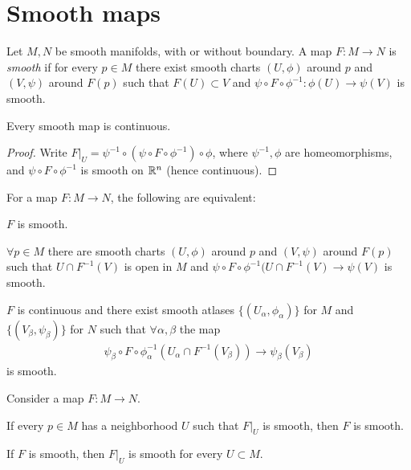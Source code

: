 \documentclass{skript}
\begin{document}
\section{Smooth maps}
\begin{definition}\label{def:smoothmap}
Let $M,N$ be smooth manifolds, with or without boundary.
A map $F\colon M\to N$ is \emph{smooth} if for every $p\in M$ there exist smooth charts $(U,\phi)$ around $p$ and $(V,\psi)$ around $F(p)$ such that $F(U)\subset V$ and $\psi\circ F\circ \phi^{-1}\colon \phi(U) \to \psi(V)$ is smooth. 
\end{definition}

\begin{prop}\label{prop:smoothmapcont}
    Every smooth map is continuous.
\end{prop}
\begin{proof}
    Write $F|_U = \psi^{-1}\circ (\psi\circ F\circ \phi^{-1})\circ \phi$, 
    where $\psi^{-1},\phi$ are homeomorphisms, and $\psi\circ F\circ\phi^{-1}$ is smooth on $\mathbb{R}^n$ (hence continuous).
\end{proof}

\begin{prop}
    For a map $F\colon M\to N$, the following are equivalent:
    \begin{alphanumerate}
    \item
        $F$ is smooth.
    \item
        $\forall p\in M$ there are smooth charts $(U,\phi)$ around $p$ and $(V,\psi)$ around $F(p)$ such that $U\cap F^{-1}(V)$ is open in $M$ and $\psi\circ F\circ \phi^{-1} (U\cap F^{-1}(V)\to \psi(V)$ is smooth.
    \item
        $F$ is continuous and there exist smooth atlases $\{(U_\alpha, \phi_\alpha)\}$ for $M$ and $\{(V_\beta, \psi_\beta)\}$ for $N$ such that $\forall \alpha,\beta$ the map
        \begin{align*}
            \psi_\beta \circ F \circ \phi^{-1}_\alpha (U_\alpha\cap F^{-1}(V_\beta)) \to \psi_\beta (V_\beta)
        \end{align*}
        is smooth.
    \end{alphanumerate}
    
\end{prop}

\begin{prop}
    Consider a map $F\colon M\to N$.
    \begin{alphanumerate}
    \item 
        If every $p\in M$ has a neighborhood $U$ such that $F|_U$ is smooth, then $F$ is smooth.
    \item
        If $F$ is smooth, then $F|_U$ is smooth for every $U\subset M$.
    \end{alphanumerate}
    
\end{prop}
\end{document}
